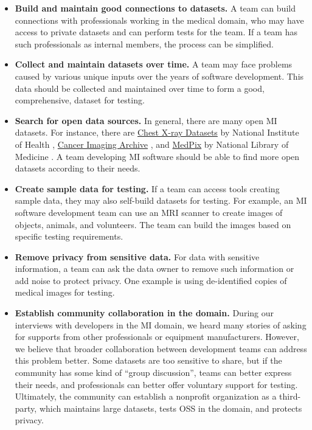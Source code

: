\documentclass[final, 3p, times, authoryear]{elsarticle}
\begin{document}
\begin{itemize}
\item \textbf{Build and maintain good connections to datasets.} A team can build
connections with professionals working in the medical domain, who may have
access to private datasets and can perform tests for the team. If a team has
such professionals as internal members, the process can be simplified.

\item \textbf{Collect and maintain datasets over time.} A team may face problems
caused by various unique inputs over the years of software development. This
data should be collected and maintained over time to form a good, comprehensive,
dataset for testing.

\item \textbf{Search for open data sources.} In general, there are many open MI
datasets.  For instance, there are
\href{https://nihcc.app.box.com/v/ChestXray-NIHCC}{Chest X-ray Datasets} by
National Institute of Health \citep{WangEtAl2017},
\href{https://www.cancerimagingarchive.net/}{Cancer Imaging Archive}
\citep{PriorEtAl2017}, and \href{https://medpix.nlm.nih.gov/home}{MedPix} by
National Library of Medicine \citep{Smirniotopoulos2014}. A team developing MI
software should be able to find more open datasets according to their needs.

\item \textbf{Create sample data for testing.} If a team can access tools
creating sample data, they may also self-build datasets for testing. For
example, an MI software development team can use an MRI scanner to create images
of objects, animals, and volunteers. The team can build the images based on
specific testing requirements.

\item \textbf{Remove privacy from sensitive data.} For data with sensitive
information, a team can ask the data owner to remove such information or add
noise to protect privacy. One example is using de-identified copies of medical
images for testing.

\item \textbf{Establish community collaboration in the domain.} During our
interviews with developers in the MI domain, we heard many stories of asking for
supports from other professionals or equipment manufacturers. However, we
believe that broader collaboration between development teams can address this
problem better. Some datasets are too sensitive to share, but if the community
has some kind of ``group discussion'', teams can better express their needs, and
professionals can better offer voluntary support for testing. Ultimately, the
community can establish a nonprofit organization as a third-party, which
maintains large datasets, tests OSS in the domain, and protects privacy. 

\end{itemize}
\end{document}
